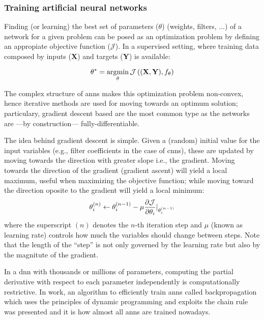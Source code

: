 \documentclass[../main.tex]{subfiles}
\begin{document}
\subsubsection{Training artificial neural networks}\label{sec:optimizers}
Finding (or learning) the best set of parameters ($\theta$) (weights, filters,
...) of a network for a given problem can be posed as an optimization problem by
defining an appropiate objective function ($\mathcal{J}$).
In a supervised setting, where training data composed by
inputs (\textbf{X}) and targets (\textbf{Y}) is available:

\begin{equation}
\theta^* = \operatorname*{arg\!\min}_{\theta} \mathcal{J}
\left( (\mathbf{X}, \mathbf{Y}), f_{\theta} \right)
\end{equation}

The complex structure of \glspl{ann} makes this optimization problem non-convex,
hence iterative methods are used for moving towards an optimum solution;
particulary, gradient descent based are the most common type as the networks
are ---by construction--- fully-differentiable.

The idea behind gradient descent is simple. Given a (random) initial value
for the input variables (e.g., filter coefficients in the case of \glspl{cnn}),
these are updated by moving towards the direction with greater slope
i.e., the gradient. Moving towards the direction of the gradient (gradient
ascent) will yield a local maximum, useful when maximizing the objective
function; while moving toward the direction oposite to the gradient will
yield a local minimum:
\begin{equation}\label{eq:gradient-descent}
\theta_i^{(n)} \leftarrow \theta_i^{(n - 1)}
- \mu \frac{\partial \mathcal{J}}{\partial \theta_i}
\rvert_{\theta_i^{(n - 1)}}
\end{equation}
where the superscript $(n)$ denotes the $n$-th iteration step and $\mu$
(known as learning rate) controls how much the variables should change between
steps. Note that the length of the ``step'' is not only governed by the
learning rate but also by the magnitute of the gradient.

In a \gls{dnn} with thousands or millions of parameters, computing the partial
derivative with respect to each parameter independently is computationally restrictive.
In \cite{backprop} work, an algorithm to efficiently train \glspl{ann}
called backpropagation\footnotemark{}  which uses the principles of dynamic
programming and exploits the chain rule was presented and it is how almost
all \glspl{ann} are trained nowadays.
\end{document}
